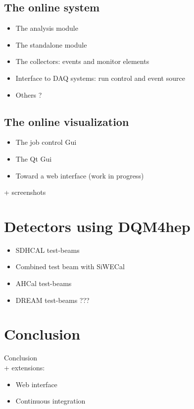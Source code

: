 \documentclass{webofc}
\begin{document}
\subsection{The online system}
\label{subsec:online}

\begin{itemize}
  \item The analysis module
  \item The standalone module
  \item The collectors: events and monitor elements
  \item Interface to DAQ systems: run control and event source
  \item Others ?
\end{itemize}

\subsection{The online visualization}
\label{subsec:vis}

\begin{itemize}
  \item The job control Gui
  \item The Qt Gui
  \item Toward a web interface (work in progress)
\end{itemize}

+ screenshots

\section{Detectors using DQM4hep}
\label{sec:detectors}

\begin{itemize}
  \item SDHCAL test-beams
  \item Combined test beam with SiWECal
  \item AHCal test-beams
  \item DREAM test-beams ???
\end{itemize}

\section{Conclusion}
\label{sec:conclusion}

Conclusion \\
+ extensions:

\begin{itemize}
  \item Web interface
  \item Continuous integration
\end{itemize}
\end{document}
